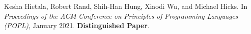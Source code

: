 \documentclass[11pt]{article}
\begin{document}
\begin{description}

  





\item
Kesha Hietala, Robert Rand, Shih-Han Hung, Xiaodi Wu, and Michael Hicks.
 In {\em Proceedings of the {ACM} Conference on Principles of
  Programming Languages (POPL)}, January 2021.
\textbf{Distinguished Paper}.



\end{description}
\end{document}
